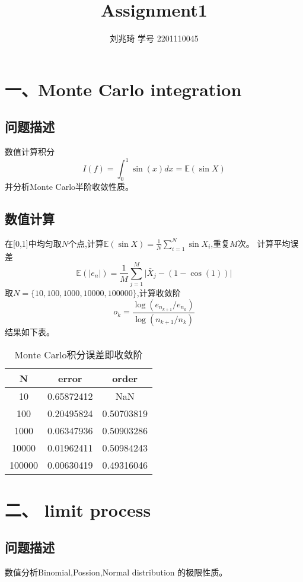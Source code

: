 \documentclass{article}
\title{\bfseries Assignment1}
\author{刘兆琦  \quad  学号 2201110045}
\begin{document}
\maketitle
 \setcounter{section}{1}
\section*{一、Monte Carlo integration}
\subsection{问题描述}
    数值计算积分
    \begin{equation}
        I(f)=\int_0^1 \sin(x)dx = \mathbb{E}(\sin X)
    \end{equation}
    并分析Monte Carlo半阶收敛性质。
\subsection{数值计算}
    在[0,1]中均匀取$N$个点,计算$\mathbb{E}(\sin X)=\frac{1}{N}\sum_{i=1}^N \sin X_i$,重复$M$次。
    计算平均误差$$\mathbb{E}(\vert e_n \vert)=\frac{1}{M}\sum_{j=1}^M\vert \bar{X}_j - (1-\cos(1)) \vert$$
    取$N=\{10,100,1000,10000,100000\}$,计算收敛阶
    $$o_k=\frac{\log(e_{n_{k+1}}/e_{n_k})}{\log(n_{k+1}/n_k)}$$
    结果如下表。
    \begin{table}[H]
        \caption{Monte Carlo积分误差即收敛阶}
        \centering
        \bigskip
        \begin{small}
        \begin{tabular}{|c|c|c|}
            \hline
            N & error &order   \\
            \hline
            10  &0.65872412 &NaN        \\
            100  &0.20495824  &0.50703819 \\
            1000  &0.06347936  &0.50903286  \\
            10000  &0.01962411  &0.50984243  \\
            100000  &0.00630419  &0.49316046  \\
            \hline
        \end{tabular}
    \end{small}
    \end{table}
 \setcounter{section}{2}
\section*{二、 limit process}
\subsection{问题描述}
    数值分析Binomial,Possion,Normal distribution 的极限性质。
\end{document}
